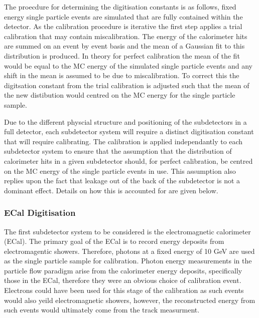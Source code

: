 The proecdure for determining the digitisation constants is as follows, fixed energy single particle events are simulated that are fully contained within the detector.  As the calibration procedure is iterative the first step applies a trial calibration that may contain miscalibration.  The energy of the calorimeter hits are summed on an event by event basis and the mean of a Gaussian fit to this distribution is produced.  In theory for perfect calibration the mean of the fit would be equal to the MC energy of the simulated single particle events and any shift in the mean is assumed to be due to miscalibration.  To correct this the digitsation constant from the trial calibration is adjusted such that the mean of the new distibution would centred on the MC energy for the single particle sample.  

Due to the different physcial structure and positioning of the subdetectors in a full detector, each subdetector system will require a distinct digitisation constant that will require calibrating.  The calibration is applied independantly to each subdetector system to ensure that the assumption that the distribution of calorimeter hits in a given subdetector should, for perfect calibration, be centred on the MC energy of the single particle events in use.  This assumption also replies upon the fact that leakage out of the back of the subdetector is not a dominant effect.  Details on how this is accounted for are given below.

\subsubsection{ECal Digitisation}

The first subdetector system to be considered is the electromagnetic calorimeter (ECal).  The primary goal of the ECal is to record energy deposits from electromagentic showers.  Therefore, photons at a fixed energy of 10 GeV are used as the single particle sample for calibration.  Photon energy measurements in the particle flow paradigm arise from the calorimeter energy deposits, specifically those in the ECal, therefore they were an obvious choice of calibration event.  Electrons could have been used for this stage of the calibration as such events would also yeild electromagnetic showers, however, the reconstructed energy from such events would ultimately come from the track measurment.  

